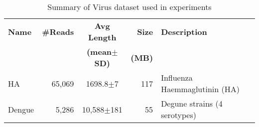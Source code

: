\begin{table}
  \caption{Summary of Virus dataset used in experiments}
  \begin{center}
    \begin{tabular}{|l|r|c|r|p{1in}|}
      \hline

      {\bf Name} & {\bf \#Reads} & {\bf Avg Length} & {\bf Size}  & {\bf Description}  \\
           &         & {\bf (mean$\pm$ SD)} & {\bf (MB)}  &   \\ \hline

      HA   & 65,069 & 1698.8$\pm$7 & 117 & Influenza Haemmaglutinin  (HA) \\ \hline

      Dengue  & 5,286 & 10,588$\pm$181 & 55 & Degune strains (4 serotypes) \\

      \hline
    \end{tabular}\label{tab:virus-ds}
  \end{center}
\end{table}
